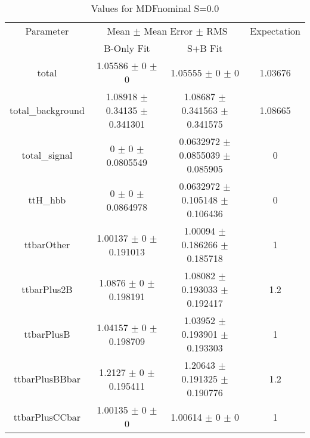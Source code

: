 \begin{table}
\centering
\caption{Values for MDFnominal S=0.0}
\begin{tabular}{cccc}
\toprule
Parameter & \multicolumn{2}{c}{Mean $\pm$ Mean Error $\pm$ RMS} & Expectation\\
 & B-Only Fit & S+B Fit & \\
\midrule
total & \num{1.05586} $\pm$ \num{0} $\pm$ \num{0} & \num{1.05555} $\pm$ \num{0} $\pm$ \num{0} & \num{1.03676}\\
total\_background & \num{1.08918} $\pm$ \num{0.34135} $\pm$ \num{0.341301} & \num{1.08687} $\pm$ \num{0.341563} $\pm$ \num{0.341575} & \num{1.08665}\\
total\_signal & \num{0} $\pm$ \num{0} $\pm$ \num{0.0805549} & \num{0.0632972} $\pm$ \num{0.0855039} $\pm$ \num{0.085905} & \num{0}\\
ttH\_hbb & \num{0} $\pm$ \num{0} $\pm$ \num{0.0864978} & \num{0.0632972} $\pm$ \num{0.105148} $\pm$ \num{0.106436} & \num{0}\\
ttbarOther & \num{1.00137} $\pm$ \num{0} $\pm$ \num{0.191013} & \num{1.00094} $\pm$ \num{0.186266} $\pm$ \num{0.185718} & \num{1}\\
ttbarPlus2B & \num{1.0876} $\pm$ \num{0} $\pm$ \num{0.198191} & \num{1.08082} $\pm$ \num{0.193033} $\pm$ \num{0.192417} & \num{1.2}\\
ttbarPlusB & \num{1.04157} $\pm$ \num{0} $\pm$ \num{0.198709} & \num{1.03952} $\pm$ \num{0.193901} $\pm$ \num{0.193303} & \num{1}\\
ttbarPlusBBbar & \num{1.2127} $\pm$ \num{0} $\pm$ \num{0.195411} & \num{1.20643} $\pm$ \num{0.191325} $\pm$ \num{0.190776} & \num{1.2}\\
ttbarPlusCCbar & \num{1.00135} $\pm$ \num{0} $\pm$ \num{0} & \num{1.00614} $\pm$ \num{0} $\pm$ \num{0} & \num{1}\\
\bottomrule
\end{tabular}
\end{table}